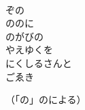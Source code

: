 \documentclass[10pt,b5j]{tarticle} %
\begin{document}
\begin{enumerate}
\begin{minipage}[c]{\blocksize}
        \vspace{\linespace}
        \item~\\
        ぞの\\
        ののに\\
        のがびの\\
        やえゆくを\\
        にくしるさんと\\
        ごゑき
        
    \end{minipage}
\end{enumerate} %

\begin{flushright}
    （「の」のによる）
\end{flushright}
    
\end{document}
